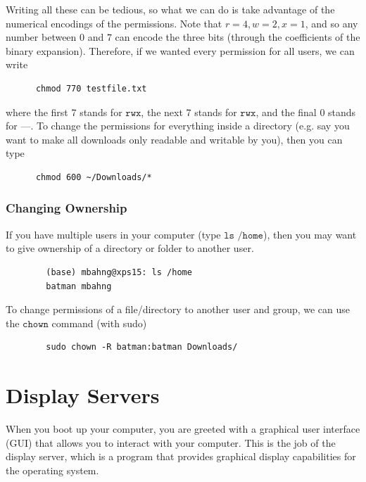 \documentclass{article}
\begin{document}
      Writing all these can be tedious, so what we can do is take advantage of the numerical encodings of the permissions. Note that $r=4, w=2, x=1$, and so any number between $0$ and $7$ can encode the three bits (through the coefficients of the binary expansion). Therefore, if we wanted every permission for all users, we can write 
      \begin{lstlisting}
      chmod 770 testfile.txt
      \end{lstlisting}
      where the first 7 stands for $\texttt{rwx}$, the next 7 stands for $\texttt{rwx}$, and the final $0$ stands for $\texttt{---}$. To change the permissions for everything inside a directory (e.g. say you want to make all downloads only readable and writable by you), then you can type 
      \begin{lstlisting}
      chmod 600 ~/Downloads/*
      \end{lstlisting}

    \subsubsection{Changing Ownership}

      If you have multiple users in your computer (type $\texttt{ls /home}$), then you may want to give ownership of a directory or folder to another user. 
      \begin{lstlisting}
        (base) mbahng@xps15: ls /home
        batman mbahng
      \end{lstlisting}
      To change permissions of a file/directory to another user and group, we can use the $\texttt{chown}$ command (with sudo) 
      \begin{lstlisting}
        sudo chown -R batman:batman Downloads/
      \end{lstlisting}

\section{Display Servers}

  When you boot up your computer, you are greeted with a graphical user interface (GUI) that allows you to interact with your computer. This is the job of the display server, which is a program that provides graphical display capabilities for the operating system. 
\end{document}
